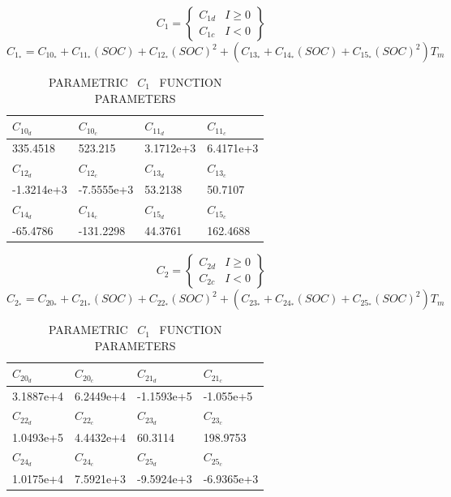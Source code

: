 \documentclass[10pt]{article}
\begin{document}
\begin{equation}
C_{1} = 
\begin{Bmatrix}
C_{1d}&I\ge 0 \\
C_{1c} &I<0
\end{Bmatrix}
\end{equation}
\begin{equation}
C_{1_{*}}=C_{10_{*}}+C_{11_{*}}(SOC)+C_{12_{*}}(SOC)^{2}+(C_{13_{*}}+C_{14_{*}}(SOC)+C_{15_{*}}(SOC)^{2}){T_m}
\end{equation}
\begin{table}[H]
	\caption{PARAMETRIC \ $C_1$ \  FUNCTION PARAMETERS}
	\vspace{-0.4cm}
	\centering
	\begin{tabular}{llll}
		\hline
		$C_{10_{d}}$ & $C_{10_{c}}$ & $C_{11_{d}}$ & $C_{11_{c}}$ \\
		\hline
		335.4518 & 523.215 & 3.1712e+3 & 6.4171e+3  \\
		\hline
		$C_{12_{d}}$ & $C_{12_{c}}$ & $C_{13_{d}}$ & $C_{13_{c}}$ \\
		\hline
		-1.3214e+3 & -7.5555e+3 & 53.2138 & 50.7107 \\
		\hline
		$C_{14_{d}}$ & $C_{14_{c}}$ & $C_{15_{d}}$ & $C_{15_{c}}$ \\
		\hline
		-65.4786 & -131.2298 & 44.3761 & 162.4688 \\
		\hline
	\end{tabular}
\end{table}
\begin{equation}
C_{2} = 
\begin{Bmatrix}
C_{2d}&I\ge 0  \\
C_{2c} &I<0
\end{Bmatrix}
\end{equation}
\begin{equation}
C_{2_{*}}=C_{20_{*}}+C_{21_{*}}(SOC)+C_{22_{*}}(SOC)^{2}+(C_{23_{*}}+C_{24_{*}}(SOC)+C_{25_{*}}(SOC)^{2}){T_m}
\end{equation}
\begin{table}[H]
	\caption{PARAMETRIC \ $C_1$ \ FUNCTION PARAMETERS}
	\vspace{-0.4cm}
	\centering
	\begin{tabular}{llll}
		\hline
		$C_{20_{d}}$ & $C_{20_{c}}$ & $C_{21_{d}}$ & $C_{21_{c}}$ \\
		\hline
		3.1887e+4 & 6.2449e+4 & -1.1593e+5 & -1.055e+5  \\
		\hline
		$C_{22_{d}}$ & $C_{22_{c}}$ & $C_{23_{d}}$ & $C_{23_{c}}$ \\
		\hline
		1.0493e+5 & 4.4432e+4 & 60.3114 & 198.9753 \\
		\hline
		$C_{24_{d}}$ & $C_{24_{c}}$ & $C_{25_{d}}$ & $C_{25_{c}}$ \\
		\hline
		1.0175e+4 & 7.5921e+3 & -9.5924e+3 & -6.9365e+3 \\
		\hline
	\end{tabular}
\end{table}
\end{document}
